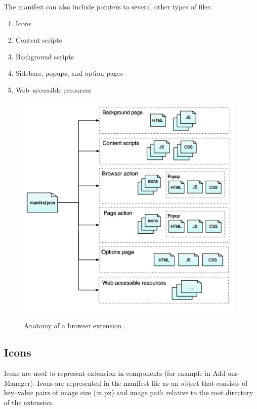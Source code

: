 The manifest can also include pointers to several other types of files:
\begin{enumerate}
    \item Icons
    \item Content scripts
    \item Background scripts
    \item Sidebars, popups, and option pages
    \item Web--accessible resources
\end{enumerate}
\begin{figure}
    \begin{center}
        \label{img:extensionAnatomy}
        \includegraphics[width=1.0\textwidth]{obrazky-figures/webextension-anatomy.png}
        \caption{Anatomy of a browser extension \cite{extensionAnatomy}.}
    \end{center}
\end{figure}

\subsection{Icons}
Icons are used to represent extension in components (for example in Add-ons Manager). Icons are represented in the manifest file as an object that consists of key--value pairs of image size (in px) and image path relative to the root directory of the extension.

